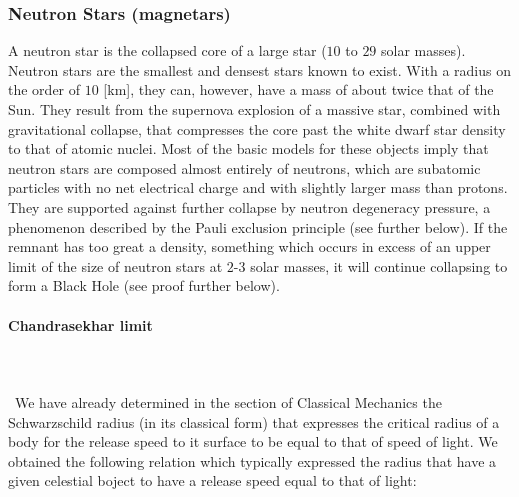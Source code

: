 	\subsubsection{Neutron Stars (magnetars)}
	A neutron star is the collapsed core of a large star ($10$ to $29$ solar masses). Neutron stars are the smallest and densest stars known to exist. With a radius on the order of $10$ [km], they can, however, have a mass of about twice that of the Sun. They result from the supernova explosion of a massive star, combined with gravitational collapse, that compresses the core past the white dwarf star density to that of atomic nuclei. Most of the basic models for these objects imply that neutron stars are composed almost entirely of neutrons, which are subatomic particles with no net electrical charge and with slightly larger mass than protons. They are supported against further collapse by neutron degeneracy pressure, a phenomenon described by the Pauli exclusion principle (see further below). If the remnant has too great a density, something which occurs in excess of an upper limit of the size of neutron stars at $2$-$3$ solar masses, it will continue collapsing to form a Black Hole (see proof further below).
	
	\paragraph{Chandrasekhar limit}\mbox{}\\\\\
	We have already determined in the section of Classical Mechanics the Schwarzschild radius (in its classical form) that expresses the critical radius of a body for the release speed to it surface to be equal to that of speed of light. We obtained the following relation which typically expressed the radius that have a given celestial boject to have a release speed equal to that of light:
	
